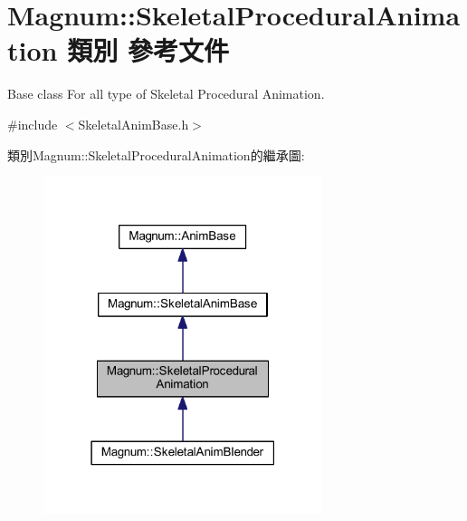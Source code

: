 \hypertarget{class_magnum_1_1_skeletal_procedural_animation}{}\section{Magnum\+:\+:Skeletal\+Procedural\+Animation 類別 參考文件}
\label{class_magnum_1_1_skeletal_procedural_animation}


Base class For all type of Skeletal Procedural Animation.  




{\ttfamily \#include $<$Skeletal\+Anim\+Base.\+h$>$}



類別\+Magnum\+:\+:Skeletal\+Procedural\+Animation的繼承圖\+:\nopagebreak
\begin{figure}[H]
\begin{center}
\leavevmode
\includegraphics[width=231pt]{class_magnum_1_1_skeletal_procedural_animation__inherit__graph}
\end{center}
\end{figure}


